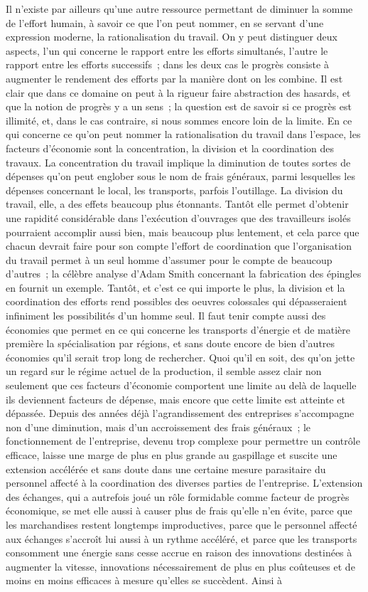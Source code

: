 \documentclass[french,twoside]{book} %
\begin{document}
Il n'existe par ailleurs qu'une autre ressource permettant de diminuer la somme de l'effort humain, à savoir ce que l'on peut nommer, en se servant d'une expression moderne, la rationalisation du travail. On y peut distinguer deux aspects, l'un qui concerne le rapport entre les efforts simultanés, l'autre le rapport entre les efforts successifs ; dans les deux cas le progrès consiste à augmenter le rendement des efforts par la manière dont on les combine. Il est clair que dans ce domaine on peut à la rigueur faire abstraction des hasards, et que la notion de progrès y a un sens ; la question est de savoir si ce progrès est illimité, et, dans le cas contraire, si nous sommes encore loin de la limite. En ce qui concerne ce qu'on peut nommer la rationalisation du travail dans l'espace, les facteurs d'économie sont la concentration, la division et la coordination des travaux. La concentration du travail implique la diminution de toutes sortes de dépenses qu'on peut englober sous le nom de frais généraux, parmi lesquelles les dépenses concernant le local, les transports, parfois l'outillage. La division du travail, elle, a des effets beaucoup plus étonnants. Tantôt elle permet d'obtenir une rapidité considérable dans l'exécution d'ouvrages que des travailleurs isolés pourraient accomplir aussi bien, mais beaucoup plus lentement, et cela parce que chacun devrait faire pour son compte l'effort de coordination que l'organisation du travail permet à un seul homme d'assumer pour le compte de beaucoup d'autres ; la célèbre analyse d'Adam Smith concernant la fabrication des épingles en fournit un exemple. Tantôt, et c'est ce qui importe le plus, la division et la coordination des efforts rend possibles des oeuvres colossales qui dépasseraient infiniment les possibilités d'un homme seul. Il faut tenir compte aussi des économies que permet en ce qui concerne les transports d'énergie et de matière première la spécialisation par régions, et sans doute encore de bien d'autres économies qu'il serait trop long de rechercher. Quoi qu'il en soit, des qu’on jette un regard sur le régime actuel de la production, il semble assez clair non seulement que ces facteurs d'économie comportent une limite au delà de laquelle ils deviennent facteurs de dépense, mais encore que cette limite est atteinte et dépassée. Depuis des années déjà l'agrandissement des entreprises s'accompagne non d'une diminution, mais d'un accroissement des frais généraux ; le fonctionnement de l'entreprise, devenu trop complexe pour permettre un contrôle efficace, laisse une marge de plus en plus grande au gaspillage et suscite une extension accélérée et sans doute dans une certaine mesure parasitaire du personnel affecté à la coordination des diverses parties de l'entreprise. L'extension des échanges, qui a autrefois joué un rôle formidable comme facteur de progrès économique, se met elle aussi à causer plus de frais qu'elle n'en évite, parce que les marchandises restent longtemps improductives, parce que le personnel affecté aux échanges s'accroît lui aussi à un rythme accéléré, et parce que les transports consomment une énergie sans cesse accrue en raison des innovations destinées à augmenter la vitesse, innovations nécessairement de plus en plus coûteuses et de moins en moins efficaces à mesure qu'elles se succèdent. Ainsi à 
\end{document}
